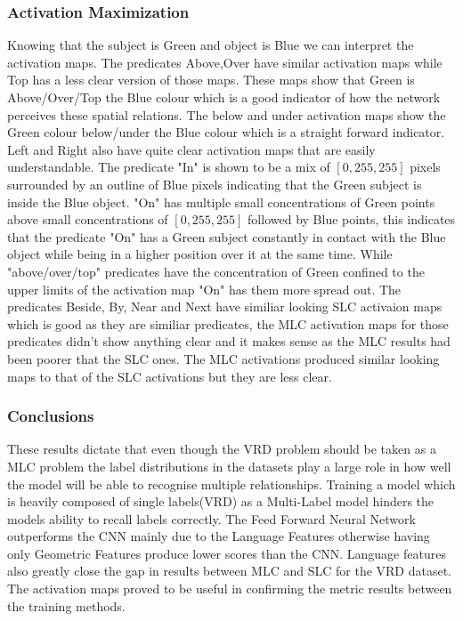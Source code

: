 \documentclass{IEEEtran}
\begin{document}
\subsubsection{Activation Maximization}
Knowing that the subject is Green and object is Blue we can interpret the activation maps. The predicates Above,Over have similar activation maps while Top has a less clear version of those maps. These maps show that Green is Above/Over/Top the Blue colour which is a good indicator of how the network perceives these spatial relations. The below and under activation maps show the Green colour below/under the Blue colour which is a straight forward indicator. Left and Right also have quite clear activation maps that are easily understandable. The predicate "In" is shown to be a mix of $[0,255,255]$ pixels surrounded by an outline of Blue pixels indicating that the Green subject is inside the Blue object. "On" has multiple small concentrations  of Green points above small concentrations of $[0,255,255]$ followed by Blue points, this indicates that the predicate "On" has a Green subject constantly in contact with the Blue object while being in a higher position over it at the same time. While "above/over/top" predicates have the concentration of Green confined to the upper limits of the activation map "On" has them more spread out. The predicates Beside, By, Near and Next have similiar looking SLC activaion maps which is good as they are similiar predicates, the MLC activation maps for those predicates didn't show anything clear and it makes sense as the MLC results had been poorer that the SLC ones. The MLC activations produced similar looking maps to that of the SLC activations but they are less clear.

\subsubsection{Conclusions}
These results dictate that even though the VRD problem should be taken as a MLC problem the label distributions in the datasets play a large role in how well the model will be able to recognise multiple relationships. Training a model which is heavily composed of single labels(VRD) as a Multi-Label model hinders the models ability to recall labels correctly. The Feed Forward Neural Network outperforms the CNN mainly due to the Language Features otherwise having only Geometric Features produce lower scores than the CNN. Language features also greatly close the gap in results between MLC and SLC for the VRD dataset. The activation maps proved to be useful in confirming the metric results between the training methods.
\end{document}

